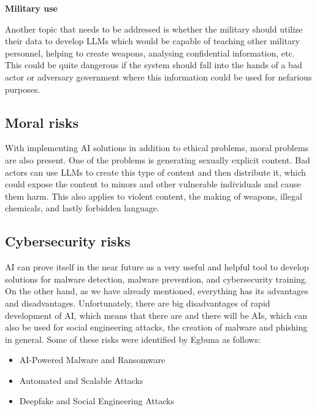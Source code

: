\textbf{Military use}

Another topic that needs to be addressed is whether the military should utilize their data to develop LLMs which would be capable of teaching other military personnel, helping to create weapons, analysing confidential information, etc. This could be quite dangerous if the system should fall into the hands of a bad actor or adversary government where this information could be used for nefarious purposes.


\subsection{Moral risks}
With implementing AI solutions in addition to ethical problems, moral problems are also present. One of the problems is generating sexually explicit content. Bad actors can use LLMs to create this type of content and then distribute it, which could expose the content to minors and other vulnerable individuals and cause them harm. This also applies to violent content, the making of weapons, illegal chemicals, and lastly forbidden language.


\subsection{Cybersecurity risks}
AI can prove itself in the near future as a very useful and helpful tool to develop solutions for malware detection, malware prevention, and cybersecurity training. On the other hand, as we have already mentioned, everything has its advantages and disadvantages. Unfortunately, there are big disadvantages of rapid development of AI, which means that there are and there will be AIs, which can also be used for social engineering attacks, the creation of malware and phishing in general. Some of these risks were identified by Egbuna\cite{Princess-Egbuna_2021} as follows:

\begin{itemize}
    \item AI-Powered Malware and Ransomware
    \item Automated and Scalable Attacks
    \item Deepfake and Social Engineering Attacks
\end{itemize}

